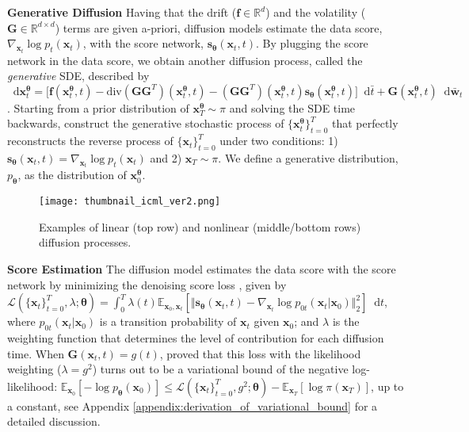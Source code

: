 \documentclass{article}
\theoremstyle{definition}
\theoremstyle{remark}
\newcommand*\diff{\mathop{}\!\mathrm{d}}
\begin{document}
	\textbf{Generative Diffusion} Having that the drift ($\mathbf{f}\in\mathbb{R}^{d}$) and the volatility ($\mathbf{G}\in\mathbb{R}^{d\times d}$) terms are given a-priori, diffusion models \citep{song2020score} estimate the data score, $\nabla_{\mathbf{x}_{t}}\log{p_{t}(\mathbf{x}_{t})}$, with the score network, $\mathbf{s}_{\bm{\theta}}(\mathbf{x}_{t},t)$. By plugging the score network in the data score, we obtain another diffusion process, called the \textit{generative} SDE, described by $\diff\mathbf{x}_{t}^{\bm{\theta}}=\big[\mathbf{f}(\mathbf{x}_{t}^{\bm{\theta}},t)-\text{div}(\mathbf{G}\mathbf{G}^{T})(\mathbf{x}_{t}^{\bm{\theta}},t)-(\mathbf{G}\mathbf{G}^{T})(\mathbf{x}_{t}^{\bm{\theta}},t)\mathbf{s}_{\bm{\theta}}(\mathbf{x}_{t}^{\bm{\theta}},t)\big]\diff \bar{t} + \mathbf{G}(\mathbf{x}_{t}^{\bm{\theta}},t)\diff\mathbf{\bar{w}}_{t}$. Starting from a prior distribution of $\mathbf{x}_{T}^{\bm{\theta}}\sim\pi$ and solving the SDE time backwards, \citet{song2020score} construct the generative stochastic process of $\{\mathbf{x}_{t}^{\bm{\theta}}\}_{t=0}^{T}$ that perfectly reconstructs the reverse process of $\{\mathbf{x}_{t}\}_{t=0}^{T}$ under two conditions: 1) $\mathbf{s}_{\bm{\theta}}(\mathbf{x}_{t},t)=\nabla_{\mathbf{x}_{t}}\log{p_{t}(\mathbf{x}_{t})}$ and 2) $\mathbf{x}_{T}\sim\pi$. We define a generative distribution, $p_{\bm{\theta}}$, as the distribution of $\mathbf{x}_{0}^{\bm{\theta}}$.
	
	\begin{figure*}[t]
\centering
		\texttt{[image: thumbnail\_icml\_ver2.png]}
		\caption{Examples of linear (top row) and nonlinear (middle/bottom rows) diffusion processes.}
		\label{fig:thumbnail_icml}
\end{figure*}
	
	\textbf{Score Estimation} The diffusion model estimates the data score with the score network by minimizing the denoising score loss \citep{song2020score}, given by $\mathcal{L}(\{\mathbf{x}_{t}\}_{t=0}^{T},\lambda;\bm{\theta})=\int_{0}^{T}\lambda(t)\mathbb{E}_{\mathbf{x}_{0}, \mathbf{x}_{t}}[\Vert\mathbf{s}_{\bm{\theta}}(\mathbf{x}_{t},t)-\nabla_{\mathbf{x}_{t}}\log{p_{0t}(\mathbf{x}_{t}\vert\mathbf{x}_{0})}\Vert_{2}^{2}]\diff t$, where $p_{0t}(\mathbf{x}_{t}\vert\mathbf{x}_{0})$ is a transition probability of $\mathbf{x}_{t}$ given $\mathbf{x}_{0}$; and $\lambda$ is the weighting function that determines the level of contribution for each diffusion time. When $\mathbf{G}(\mathbf{x}_{t},t)=g(t)$, \citet{song2021maximum, huang2021variational} proved that this loss with the likelihood weighting ($\lambda=g^{2}$) turns out to be a variational bound of the negative log-likelihood: $\mathbb{E}_{\mathbf{x}_{0}}[-\log{p_{\bm{\theta}}(\mathbf{x}_{0})}]\le \mathcal{L}(\{\mathbf{x}_{t}\}_{t=0}^{T},g^{2};\bm{\theta})-\mathbb{E}_{\mathbf{x}_{T}}[\log{\pi(\mathbf{x}_{T})}]$, up to a constant, see Appendix \ref{appendix:derivation_of_variational_bound} for a detailed discussion.
	
\end{document}
